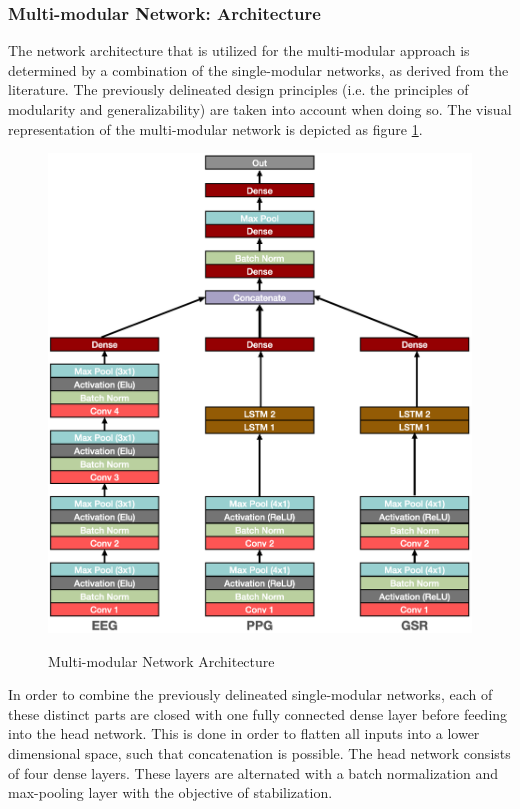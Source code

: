 \documentclass[12pt]{article}
\begin{document}
\subsubsection{Multi-modular Network: Architecture}
The network architecture that is utilized for the multi-modular approach is determined by a combination of the single-modular networks, as derived from the literature. The previously delineated design principles (i.e. the principles of modularity and generalizability) are taken into account when doing so. The visual representation of the multi-modular network is depicted as figure \ref{fig:multiarchitecture}.

\begin{figure}
\caption{Multi-modular Network Architecture}
\bigskip
\includegraphics[scale=0.725]{multi_model_architecture}
\label{fig:multiarchitecture}
\end{figure}

In order to combine the previously delineated single-modular networks, each of these distinct parts are closed with one fully connected dense layer before feeding into the head network. This is done in order to flatten all inputs into a lower dimensional space, such that concatenation is possible. The head network consists of four dense layers. These layers are alternated with a batch normalization and max-pooling layer with the objective of stabilization. 
\end{document}
